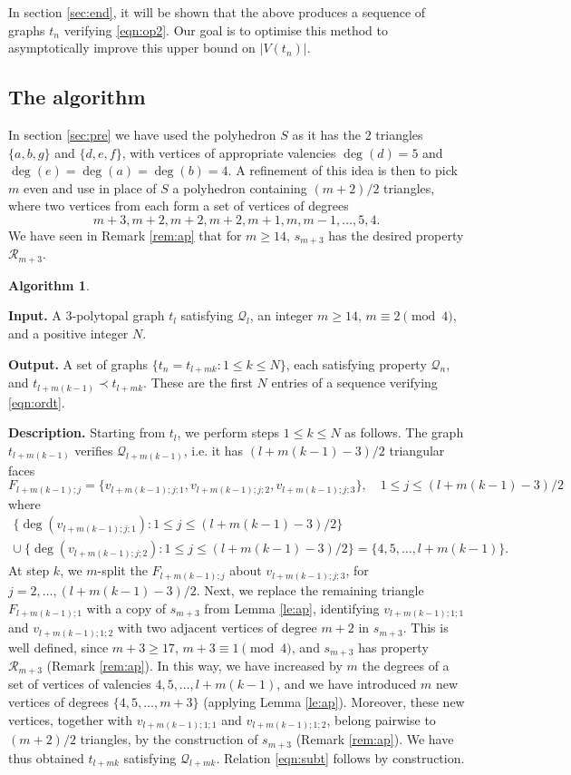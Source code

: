 \documentclass[11pt]{article}
\theoremstyle{definition}
\newtheorem{alg}[thm]{Algorithm}
\numberwithin{equation}{section}
\def\calQ{\mathcal{Q}}
\def\calR{\mathcal{R}}
\begin{document}
In section \ref{sec:end}, it will be shown that the above produces a sequence of graphs $t_{n}$ verifying \eqref{eqn:op2}. Our goal is to optimise this method to asymptotically improve this upper bound on $|V(t_n)|$.

\subsection{The algorithm}
In section \ref{sec:pre} we have used the polyhedron $S$ as it has the $2$ triangles $\{a,b,g\}$ and $\{d,e,f\}$, with vertices of appropriate valencies $\deg(d)=5$ and $\deg(e)=\deg(a)=\deg(b)=4$. A refinement of this idea is then to pick $m$ even and use in place of $S$ a polyhedron containing $(m+2)/2$ triangles, where two vertices from each form a set of vertices of degrees
\[m+3,m+2,m+2,m+2,m+1,m,m-1,\dots,5,4.\]
We have seen in Remark \ref{rem:ap} that for $m\geq 14$, $s_{m+3}$ has the desired property $\calR_{m+3}$.

\begin{alg}\
	\label{alg:2}
	
	\textbf{Input.} A $3$-polytopal graph $t_l$ satisfying $\calQ_l$, an integer $m\geq 14$, $m\equiv 2 \pmod 4$, and a positive integer $N$.
	
	\textbf{Output.} A set of graphs $\{t_n=t_{l+mk} : 1\leq k\leq N\}$, each satisfying property $\calQ_n$, and $t_{l+m(k-1)}\prec t_{l+mk}$. These are the first $N$ entries of a sequence verifying \eqref{eqn:ordt}.
	
	\textbf{Description.} Starting from $t_l$, we perform steps $1\leq k\leq N$ as follows. The graph $t_{l+m(k-1)}$ verifies $\calQ_{l+m(k-1)}$, i.e. it has $(l+m(k-1)-3)/2$ triangular faces
	\begin{equation*}
	F_{l+m(k-1);j}=\{v_{l+m(k-1);j;1}, v_{l+m(k-1);j;2}, v_{l+m(k-1);j;3}\}, \quad 1\leq j\leq(l+m(k-1)-3)/2
	\end{equation*}
	where
	\begin{multline*}
	\{\deg(v_{l+m(k-1);j;1}) : 1\leq j\leq(l+m(k-1)-3)/2\}\ \\\cup\ \{\deg(v_{l+m(k-1);j;2}) : 1\leq j\leq(l+m(k-1)-3)/2\}=\{4,5,\dots,l+m(k-1)\}.
	\end{multline*}
	At step $k$, we $m$-split the $F_{l+m(k-1);j}$ about $v_{l+m(k-1);j;3}$, for $j=2,\dots,(l+m(k-1)-3)/2$. Next, we replace the remaining triangle $F_{l+m(k-1);1}$ with a copy of $s_{m+3}$ from Lemma \ref{le:ap}, identifying $v_{l+m(k-1);1;1}$ and $v_{l+m(k-1);1;2}$ with two adjacent vertices of degree $m+2$ in $s_{m+3}$. This is well defined, since $m+3\geq 17$, $m+3\equiv 1\pmod 4$, and $s_{m+3}$ has property $\calR_{m+3}$ (Remark \ref{rem:ap}). In this way, we have increased by $m$ the degrees of a set of vertices of valencies $4,5,\dots,l+m(k-1)$, and we have introduced $m$ new vertices of degrees $\{4,5,\dots,m+3\}$ (applying Lemma \ref{le:ap}). Moreover, these new vertices, together with $v_{l+m(k-1);1;1}$ and $v_{l+m(k-1);1;2}$, belong pairwise to $(m+2)/2$ triangles, by the construction of $s_{m+3}$ (Remark \ref{rem:ap}). We have thus obtained $t_{l+mk}$ satisfying $\calQ_{l+mk}$. Relation \eqref{eqn:subt} follows by construction.
\end{alg}
\end{document}
